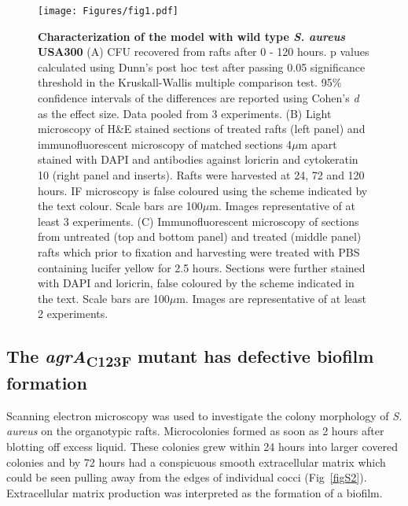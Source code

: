 \documentclass[10pt,letterpaper]{article}
\begin{document}
\begin{figure}[!ht]
\begin{adjustwidth}{-2.25in}{0in}
\texttt{[image: Figures/fig1.pdf]}
\caption[Characterization of the model with wild type \textit{S. aureus} USA300]{
	\textbf{Characterization of the model with wild type \textit{S. aureus} USA300}
	(A) CFU recovered from rafts after 0 - 120 hours. p values calculated using Dunn's post hoc test after passing 0.05 significance threshold in the Kruskall-Wallis multiple comparison test. 95\% confidence intervals of the differences are reported using Cohen's \textit{d} as the effect size. Data pooled from 3 experiments.
	(B) Light microscopy of H\&E stained sections of treated rafts (left panel) and immunofluorescent microscopy of matched sections 4$\mu$m apart stained with DAPI and antibodies against loricrin and cytokeratin 10 (right panel and inserts). Rafts were harvested at 24, 72 and 120 hours. IF microscopy is false coloured using the scheme indicated by the text colour. Scale bars are 100$\mu$m. Images representative of at least 3 experiments.
	(C) Immunofluorescent microscopy of sections from untreated (top and bottom panel) and treated (middle panel) rafts which prior to fixation and harvesting were treated with PBS containing lucifer yellow for 2.5 hours. Sections were further stained with DAPI and loricrin, false coloured by the scheme indicated in the text. Scale bars are 100$\mu$m. Images are representative of at least 2 experiments.}
    \label{fig1}
    \end{adjustwidth}
\end{figure}

\subsection*{The \textit{agrA}\textsubscript{C123F} mutant has defective biofilm formation}

Scanning electron microscopy was used to investigate the colony morphology of \textit{S. aureus} on the organotypic rafts.
Microcolonies formed as soon as 2 hours after blotting off excess liquid.
These colonies grew within 24 hours into larger covered colonies and by 72 hours had a conspicuous smooth extracellular matrix which could be seen pulling away from the edges of individual cocci (Fig~\ref{figS2}).
Extracellular matrix production was interpreted as the formation of a biofilm.
\end{document}

